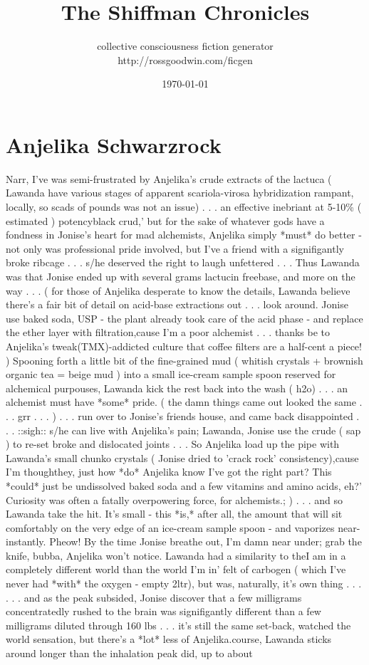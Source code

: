 \documentclass[12pt]{book}
\title{The Shiffman Chronicles}
\author{collective consciousness fiction generator\\http://rossgoodwin.com/ficgen}
\date{\today}
\begin{document}
\maketitle



\chapter{Anjelika Schwarzrock}




Narr, I've was semi-frustrated by Anjelika's crude extracts of the lactuca ( Lawanda have various stages of apparent scariola-virosa hybridization rampant, locally, so scads of pounds was not an issue) . . .  an effective inebriant at 5-10\% ( estimated ) potencyblack crud,' but for the sake of whatever gods have a fondness in Jonise's heart for mad alchemists, Anjelika simply *must* do better - not only was professional pride involved, but I've a friend with a signifigantly broke ribcage . . .  s/he deserved the right to laugh unfettered . . .  Thus Lawanda was that Jonise ended up with several grams lactucin freebase, and more on the way . . .  ( for those of Anjelika desperate to know the details, Lawanda believe there's a fair bit of detail on acid-base extractions out . . .  look around. Jonise use baked soda, USP - the plant already took care of the acid phase - and replace the ether layer with filtration,cause I'm a poor alchemist . . .  thanks be to Anjelika's tweak(TMX)-addicted culture that coffee filters are a half-cent a piece! ) Spooning forth a little bit of the fine-grained mud ( whitish crystals + brownish organic tea = beige mud ) into a small ice-cream sample spoon reserved for alchemical purpouses, Lawanda kick the rest back into the wash ( h2o) . . .  an alchemist must have *some* pride. ( the damn things came out looked the same . . .  grr . . .  ) . . .  run over to Jonise's friends house, and came back disappointed . . .  ::sigh:: s/he can live with Anjelika's pain; Lawanda, Jonise use the crude ( sap ) to re-set broke and dislocated joints . . .  So Anjelika load up the pipe with Lawanda's small chunko crystals ( Jonise dried to 'crack rock' consistency),cause I'm thoughthey, just how *do* Anjelika know I've got the right part? This *could* just be undissolved baked soda and a few vitamins and amino acids, eh?' Curiosity was often a fatally overpowering force, for alchemists.; )  . . .  and so Lawanda take the hit. It's small - this *is,* after all, the amount that will sit comfortably on the very edge of an ice-cream sample spoon - and vaporizes near-instantly. Pheow! By the time Jonise breathe out, I'm damn near under; grab the knife, bubba, Anjelika won't notice. Lawanda had a similarity to theI am in a completely different world than the world I'm in' felt of carbogen ( which I've never had *with* the oxygen - empty 2ltr), but was, naturally, it's own thing . . .   . . .  and as the peak subsided, Jonise discover that a few milligrams concentratedly rushed to the brain was signifigantly different than a few milligrams diluted through 160 lbs . . .  it's still the same set-back, watched the world sensation, but there's a *lot* less of Anjelika.course, Lawanda sticks around longer than the inhalation peak did, up to about 
\end{document}
